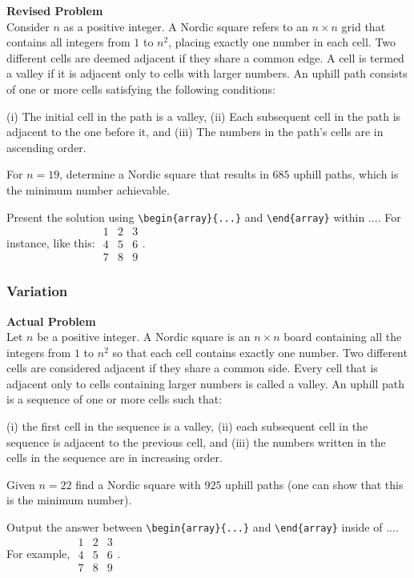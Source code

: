 \textbf{Revised Problem}\\
Consider $n$ as a positive integer. A Nordic square refers to an $n \times n$ grid that contains all integers from $1$ to $n^2$, placing exactly one number in each cell. Two different cells are deemed adjacent if they share a common edge. A cell is termed a valley if it is adjacent only to cells with larger numbers. An uphill path consists of one or more cells satisfying the following conditions:

(i) The initial cell in the path is a valley,
(ii) Each subsequent cell in the path is adjacent to the one before it, and
(iii) The numbers in the path's cells are in ascending order.

For $n = 19$, determine a Nordic square that results in $685$ uphill paths, which is the minimum number achievable.

Present the solution using \verb|\begin{array}{...}| and \verb|\end{array}| within $\boxed{...}$. For instance, like this: $\boxed{\begin{array}{ccc}1 & 2 & 3 \\ 4 & 5 & 6 \\ 7 & 8 & 9\end{array}}$.

\subsubsection{Variation}
\textbf{Actual Problem}\\
Let $n$ be a positive integer. A Nordic square is an $n \times n$ board containing all the integers from $1$ to $n^2$ so that each cell contains exactly one number. Two different cells are considered adjacent if they share a common side. Every cell that is adjacent only to cells containing larger numbers is called a valley. An uphill path is a sequence of one or more cells such that:

(i) the first cell in the sequence is a valley,
(ii) each subsequent cell in the sequence is adjacent to the previous cell, and
(iii) the numbers written in the cells in the sequence are in increasing order.

Given $n = 22$ find a Nordic square with $925$ uphill paths (one can show that this is the minimum number).


Output the answer between \verb|\begin{array}{...}| and \verb|\end{array}| inside of $\boxed{...}$. For example, $\boxed{\begin{array}{ccc}1 & 2 & 3 \\ 4 & 5 & 6 \\ 7 & 8 & 9\end{array}}$.

